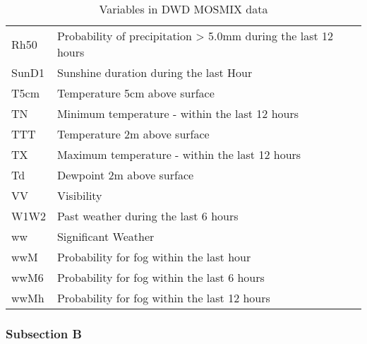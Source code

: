 \documentclass[class=scrbook, crop=false]{standalone}
\begin{document}
\begin{table}[]
\begin{tabular}{l|l}
Rh50 & Probability of precipitation > 5.0mm during the last 12 hours\\
SunD1 & Sunshine duration during the last Hour\\
T5cm & Temperature 5cm above surface\\
TN & Minimum temperature - within the last 12 hours\\
TTT & Temperature 2m above surface\\
TX & Maximum temperature - within the last 12 hours\\
Td & Dewpoint 2m above surface\\
VV & Visibility\\
W1W2 & Past weather during the last 6 hours\\
ww & Significant Weather\\
wwM & Probability for fog within the last hour\\
wwM6 & Probability for fog within the last 6 hours\\
wwMh & Probability for fog within the last 12 hours\\
\end{tabular}
\caption{Variables in DWD MOSMIX data}
\label{Table::DWD_MOSMIX_Parameters}
\end{table}

\subsection{Subsection B}
\label{Subsection::Some Appendix:Subsection B}

\Blindtext
\chapter{}

\blindtext
\Blindtext
\end{document}

